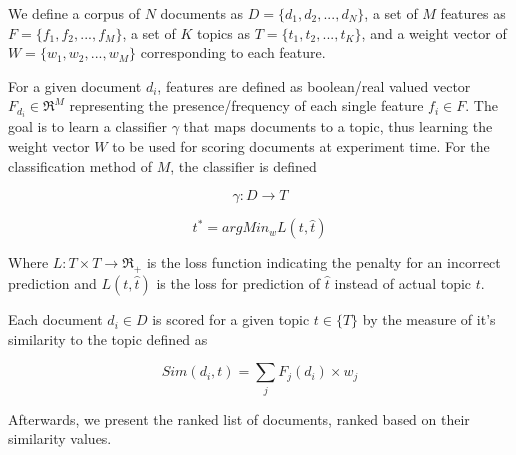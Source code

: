 

We define a corpus of $N$ documents as $D = \{{d_{1}}, {d_{2}}, ..., {d_{N}} \}$, a set of $M$ features as $F = \{{f_{1}}, {f_{2}}, ..., {f_{M}} \}$, a set of $K$ topics as $T = \{{t_{1}}, {t_{2}}, ..., {t_{K}} \}$, and a weight vector of $W = \{ {w_{1}}, {w_{2}}, ..., {w_{M}} \}$ corresponding to each feature. 

For a given document ${d_{i}}$, features are defined as boolean/real valued vector ${F_{d_{i}}} \in \Re^{M}$ representing the presence/frequency of each single feature ${f_{i}} \in F$. The goal is to learn a classifier $\gamma$ that maps documents to a topic, thus learning the weight vector $W$ to be used for scoring documents at experiment time. For the classification method of $M$, the classifier is defined

\begin{equation}
\gamma : D \to T 
\end{equation}

\begin{equation}
t^{*} = argMin_{w} L(t,\hat{t})
\end{equation}

Where ${L : T \times T \to \Re_{+} }$ is the loss function indicating the penalty for an incorrect prediction and ${L(t,\hat{t})}$ is the loss for prediction of ${\hat{t}}$ instead of actual topic $t$.

Each document ${d_{i}} \in D$ is scored for a given topic ${t \in \{ T \}}$ by the measure of it's similarity to the topic defined as

\begin{equation}
Sim({d_{i}}, t) = \sum_{j} F_{j}(d_{i}) \times {w_{j}}
\end{equation}

Afterwards, we present the ranked list of documents, ranked based on their similarity values.

